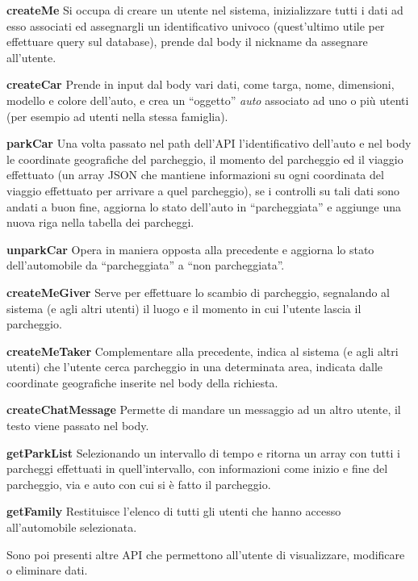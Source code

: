 \documentclass[italian, Lau, oneside, nodefaultfont, noexaminfo]{sapthesis}
\begin{document}
\begin{description}
    \item  \textbf{createMe} Si occupa di creare un utente nel sistema, inizializzare tutti i dati ad esso associati ed assegnargli un identificativo univoco (quest'ultimo utile per effettuare query sul database), prende dal body il nickname da assegnare all'utente.
    \item  \textbf{createCar} Prende in input dal body vari dati, come targa, nome, dimensioni, modello e colore dell'auto, e crea un ``oggetto'' \textit{auto} associato ad uno o più utenti (per esempio ad utenti nella stessa famiglia).
    \item \textbf{parkCar} Una volta passato nel path dell'API l'identificativo dell'auto e nel body le coordinate geografiche del parcheggio, il momento del parcheggio ed il viaggio effettuato (un array  JSON che mantiene informazioni su ogni coordinata del viaggio effettuato per arrivare a quel parcheggio), se i controlli su tali dati sono andati a buon fine,  aggiorna lo stato dell'auto in ``parcheggiata'' e aggiunge una nuova riga nella tabella dei parcheggi.
    \item \textbf{unparkCar}  Opera in maniera opposta alla precedente e aggiorna lo stato dell'automobile  da ``parcheggiata'' a ``non parcheggiata''.
    \item \textbf{createMeGiver} Serve per effettuare lo scambio di parcheggio, segnalando al sistema (e agli altri utenti) il luogo e il momento in cui l'utente lascia il parcheggio.
    \item \textbf{createMeTaker} Complementare alla precedente, indica al sistema (e agli altri utenti) che l'utente cerca parcheggio in una determinata area, indicata dalle coordinate geografiche inserite nel body della richiesta.
    \item \textbf{createChatMessage} Permette di mandare un messaggio ad un altro utente, il testo viene passato nel body.
    \item \textbf{getParkList} Selezionando un intervallo di tempo e ritorna un array con tutti i parcheggi effettuati in quell'intervallo, con informazioni come inizio e fine del parcheggio, via e auto con cui si \`e fatto il parcheggio.
    \item \textbf{getFamily} Restituisce l'elenco di tutti gli utenti che hanno accesso all'automobile selezionata.
\end{description}

Sono poi presenti altre API che permettono all'utente di visualizzare, modificare o eliminare dati.
\end{document}
